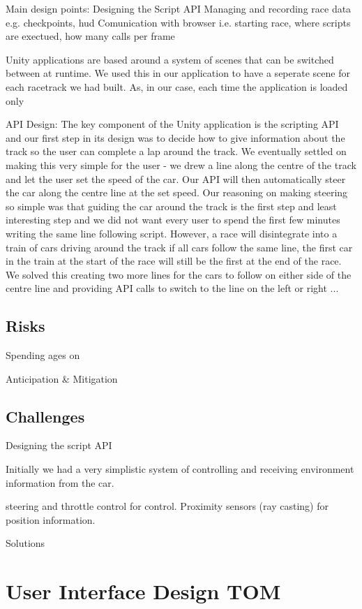 Main design points:
Designing the Script API
Managing and recording race data e.g. checkpoints, hud
Comunication with browser i.e. starting race, where scripts are exectued, how many calls per frame

Unity applications are based around a system of scenes that can be switched between at runtime. We used this in our application to have a seperate scene for each racetrack we had built. As, in our case, each time the application is loaded only

API Design: The key component of the Unity application is the scripting API and our first step in its design was to decide how to give information about the track so the user can complete a lap around the track. We eventually settled on making this very simple for the user - we drew a line along the centre of the track and let the user set the speed of the car. Our API will then automatically steer the car along the centre line at the set speed. Our reasoning on making steering so simple was that guiding the car around the track is the first step and least interesting step and we did not want every user to spend the first few minutes writing the same line following script. However, a race will disintegrate into a train of cars driving around the track if all cars follow the same line, the first car in the train at the start of the race will still be the first at the end of the race. We solved this creating two more lines for the cars to follow on either side of the centre line and providing API calls to switch to the line on the left or right ...

\subsection{Risks}
Spending ages on

Anticipation \& Mitigation

\subsection{Challenges}
Designing the script API

Initially we had a very simplistic system of controlling and receiving environment information from the car.

steering and throttle control for control. Proximity sensors (ray casting) for position information.

Solutions

\section{User Interface Design {\color{red} TOM}}

